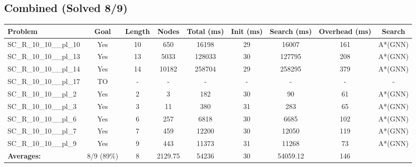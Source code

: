 \documentclass{article}
\begin{document}
\subsection*{Combined (Solved 8/9)}
\begin{tabular}{lcccccccc}
\toprule
Problem & Goal & Length & Nodes & Total (ms) & Init (ms) & Search (ms) & Overhead (ms) & Search \\
\midrule
SC\_R\_10\_10\_\_pl\_10 & Yes & 10 & 650 & 16198 & 29 & 16007 & 161 & A*(GNN) \\
SC\_R\_10\_10\_\_pl\_13 & Yes & 13 & 5033 & 128033 & 30 & 127795 & 208 & A*(GNN) \\
SC\_R\_10\_10\_\_pl\_14 & Yes & 14 & 10182 & 258704 & 29 & 258295 & 379 & A*(GNN) \\
SC\_R\_10\_10\_\_pl\_17 & TO & - & - & - & - & - & - & - \\
SC\_R\_10\_10\_\_pl\_2 & Yes & 2 & 3 & 182 & 30 & 90 & 61 & A*(GNN) \\
SC\_R\_10\_10\_\_pl\_3 & Yes & 3 & 11 & 380 & 31 & 283 & 65 & A*(GNN) \\
SC\_R\_10\_10\_\_pl\_6 & Yes & 6 & 257 & 6818 & 30 & 6685 & 102 & A*(GNN) \\
SC\_R\_10\_10\_\_pl\_7 & Yes & 7 & 459 & 12200 & 30 & 12050 & 119 & A*(GNN) \\
SC\_R\_10\_10\_\_pl\_9 & Yes & 9 & 443 & 11373 & 31 & 11268 & 73 & A*(GNN) \\
\textbf{Averages:} & 8/9 (89\%) & 8 & 2129.75 & 54236 & 30 & 54059.12 & 146 & \\
\bottomrule
\end{tabular}
\\[0.7cm]
\end{document}
